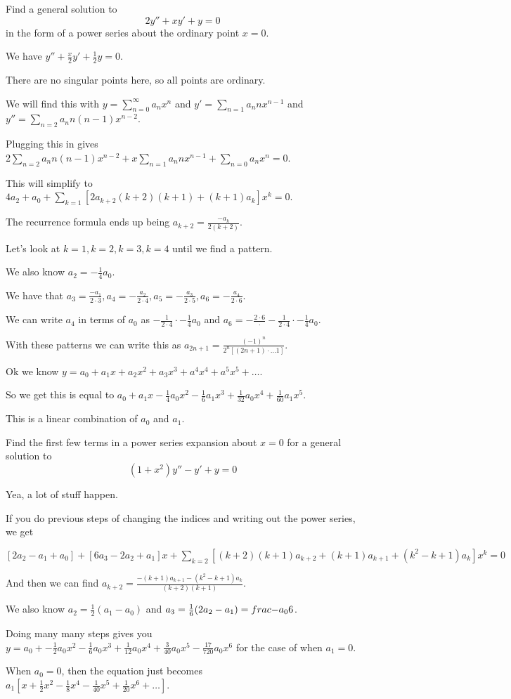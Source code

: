 \documentclass[../diffeq.tex]{subfiles}
\begin{document}
\pagebreak
\begin{example}
    Find a general solution to 
    \[ 2y''+xy'+y=0\]
    in the form of a power series about the ordinary point $x=0$.

    We have $y''+\frac{x}{2}y'+\frac{1}{2}y=0$.

    There are no singular points here, so all points are ordinary.

    We will find this with $y=\sum_{n=0}^{\infty}a_nx^n$ and $y'=\sum_{n=1}a_nnx^{n-1}$ and $y''=\sum_{n=2}a_nn(n-1)x^{n-2}$.

    Plugging this in gives $2\sum_{n=2}a_nn(n-1)x^{n-2}+x\sum_{n=1}a_nnx^{n-1}+\sum_{n=0}a_nx^n =0$.

    This will simplify to $4a_2+a_0+\sum_{k=1}[2a_{k+2}(k+2)(k+1)+(k+1)a_k]x^k =0$.

    The recurrence formula ends up being $a_{k+2}=\frac{-a_k}{2(k+2)}$.

    Let's look at $k=1, k=2,k=3,k=4$ until we find a pattern.

    We also know $a_2=-\frac{1}{4}a_0$.

    We have that $a_3=\frac{-a_1}{2\cdot 3}, a_4=-\frac{a_2}{2\cdot 4}, a_5 = -\frac{a_3}{2\cdot 5}, a_6=-\frac{a_4}{2\cdot 6}$.

    We can write $a_4$ in terms of $a_0$ as $-\frac{1}{2\cdot 4}\cdot -\frac{1}{4}a_0$ and $a_6=-\frac{2\cdot 6}\cdot -\frac{1}{2\cdot 4}\cdot -\frac{1}{4}a_0$.

    With these patterns we can write this as $a_{2n+1}=\frac{(-1)^n}{2^n[(2n+1)\cdot \dots 1]}$.

    Ok we know $y=a_0+a_1x+a_2x^2+a_3x^3+a^4x^4+a^5x^5+\dots$.

    So we get this is equal to $a_0+a_1x-\frac{1}{4}a_0x^2-\frac{1}{6}a_1x^3+\frac{1}{32}a_0x^4+\frac{1}{60}a_1x^5$.

    This is a linear combination of $a_0$ and $a_1$.
\end{example}

\begin{example}
    Find the first few terms in a power series expansion about $x=0$ for a general solution to 
    \[ (1+x^2)y''-y'+y=0 \]

    Yea, a lot of stuff happen.

    If you do previous steps of changing the indices and writing out the power series, we get 

    $[2a_2-a_1+a_0]+[6a_3-2a_2+a_1]x+\sum_{k=2}[(k+2)(k+1)a_{k+2}+(k+1)a_{k+1}+(k^2-k+1)a_k]x^k=0$

    And then we can find $a_{k+2}=\frac{-(k+1)a_{k+1}-(k^2-k+1)a_k}{(k+2)(k+1)}$.

    We also know $a_2=\frac{1}{2}(a_1-a_0)$ and $a_3=\frac{1}{6}(2a_2-a_1)=\\frac{-a_0}{6}$.

    Doing many many steps gives you $y=a_0+-\frac{1}{2}a_0x^2-\frac{1}{6}a_0x^3+\frac{1}{12}a_0x^4+\frac{3}{40}a_0x^5-\frac{17}{720}a_0x^6$ for the case of when $a_1=0$.

    When $a_0=0$, then the equation just becomes $a_1[x+\frac{1}{2}x^2-\frac{1}{8}x^4-\frac{1}{40}x^5+\frac{1}{20}x^6+\dots]$.
\end{example}
\end{document}
